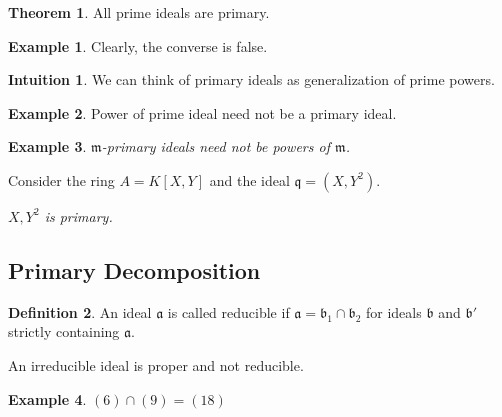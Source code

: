 \documentclass[a4paper]{book}
\theoremstyle{definition}
\newtheorem{definition}{Definition}[]
\newtheorem{example}{Example}[definition]
\newtheorem{theorem}[definition]{Theorem}
\newtheorem*{intuition}{Intuition}
\begin{document}
\begin{thmbox}
    \begin{theorem}
        All prime ideals are primary.
    \end{theorem}
\end{thmbox}
\begin{example}
    Clearly, the converse is false.
\end{example}






\begin{intuition}
    We can think of primary ideals as generalization of prime powers.
\end{intuition}
\begin{example}
    Power of prime ideal need not be a primary ideal.
\end{example}


\begin{exmbox}
    \begin{example}
        \textit{\(\mathfrak{m}\)-primary ideals need not be powers of \(\mathfrak{m}\).}

        Consider the ring \(A = K[X, Y]\) and the ideal \(\mathfrak{q} = (X, Y^2)\).

        \textit{\(X, Y^2\) is primary.} 
    \end{example}
\end{exmbox}





\newpage
\subsection{Primary Decomposition}


\begin{defbox}
    \begin{definition}
        An ideal \(\mathfrak{a}\) is called reducible if \(\mathfrak{a} = \mathfrak{b}_1 \cap \mathfrak{b}_2\) for ideals \(\mathfrak{b}\) and \(\mathfrak{b}'\) strictly containing \(\mathfrak{a}\).

        An irreducible ideal is proper and not reducible.
    \end{definition}
\end{defbox}

\begin{example}
    \((6) \cap (9) = (18)\)
\end{example}
\end{document}
